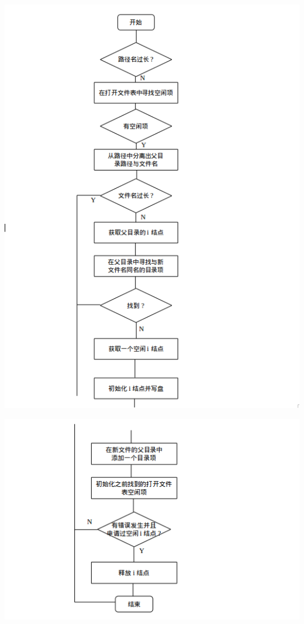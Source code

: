 \documentclass[nofonts, titlepage]{ctexart}
\begin{document}
\begin{itemize}
  \includegraphics[width=15cm]{./images/./creat_1.png}

  \includegraphics[width=15cm]{./images/./creat_2.png}
  \end{itemize}
\end{document}
